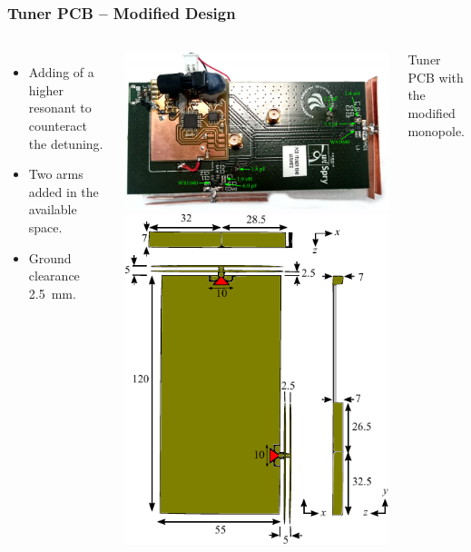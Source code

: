 \begin{frame}[fragile]
    \frametitle{Tuner PCB -- Modified Design}
    \begin{columns}[onlytextwidth,t]
          \begin{itemize}
          \item Adding of a higher resonant to counteract the detuning.
          \item Two arms added in the available space. 
          \item Ground clearance \SI{2.5}{mm}.
          \end{itemize}
        \begin{center}
            \includegraphics[scale=0.33, angle =90]{img/Lasse/lassedouble.pdf}
            \includegraphics[scale=0.53]{img/Lasse/3d_drawing_modi.pdf}
        \end{center}
        Tuner PCB with the modified monopole.
    \end{columns}
\end{frame}
\def\legendfooter{\scriptsize{Upper: Top antenna. Lower: Side antenna. \textcolor{bb}{Monopole Sim}, \textcolor{gg}{Monopole Meas}, Frequency in MHz.}}
\def\emptyline{\textcolor{white}{Empty}}

